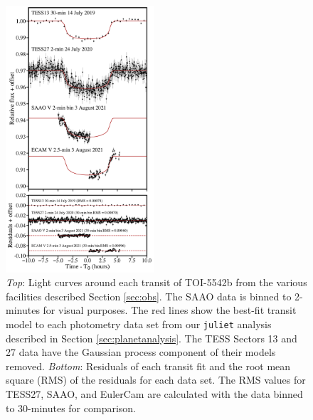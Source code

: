 \documentclass{aa}
\newcommand{\juliet}{{\sc \tt juliet}\xspace}
\begin{document}
\begin{figure}
  \centering
  \includegraphics[width=0.49\textwidth]{figures/transit_phase_TOI-5542.pdf}
 \caption{\textit{Top}: Light curves around each transit of TOI-5542b from the various facilities described Section \ref{sec:obs}. The SAAO data is binned to 2-minutes for visual purposes. The red lines show the best-fit transit model to each photometry data set from our \juliet analysis described in Section \ref{sec:planetanalysis}. The TESS Sectors 13 and 27 data have the Gaussian process component of their models removed. \textit{Bottom}: Residuals of each transit fit and the root mean square (RMS) of the residuals for each data set. The RMS values for TESS27, SAAO, and EulerCam are calculated with the data binned to 30-minutes for comparison.}
  \label{fig:transits}
\end{figure}
\end{document}
